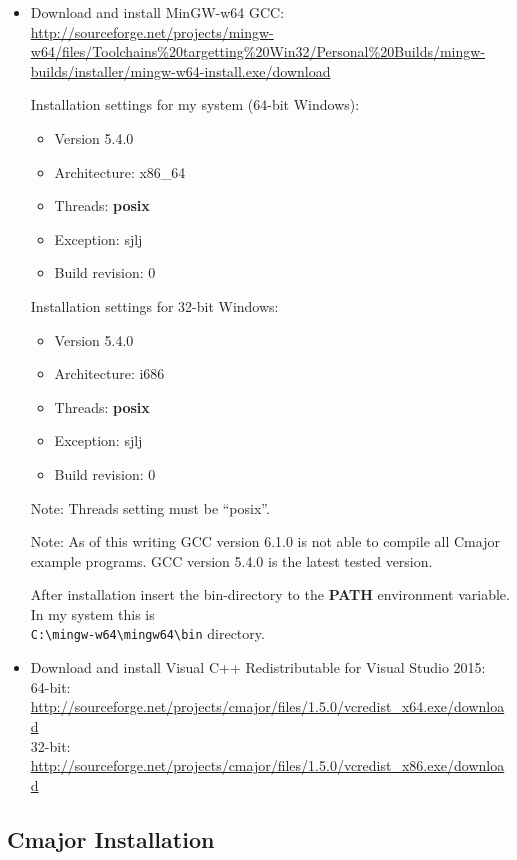 \documentclass[oneside, a4paper, 11pt]{article}
\begin{document}
\begin{itemize}

\item
Download and install MinGW-w64 GCC:\\
\url{http://sourceforge.net/projects/mingw-w64/files/Toolchains%20targetting%20Win32/Personal%20Builds/mingw-builds/installer/mingw-w64-install.exe/download}

Installation settings for my system (64-bit Windows):
\begin{itemize}
\item
Version 5.4.0
\item
Architecture: x86\_64
\item
Threads: \textbf{posix}
\item
Exception: sjlj
\item
Build revision: 0
\end{itemize}

Installation settings for 32-bit Windows:
\begin{itemize}
\item
Version 5.4.0
\item
Architecture: i686
\item
Threads: \textbf{posix}
\item
Exception: sjlj
\item
Build revision: 0
\end{itemize}

Note: Threads setting must be ``posix''.

Note: As of this writing GCC version 6.1.0 is not able to compile all Cmajor example programs.
      GCC version 5.4.0 is the latest tested version.

After installation insert the bin-directory to the \textbf{PATH} environment variable.
In my system this is\\
\verb|C:\mingw-w64\mingw64\bin| directory.

\item
Download and install Visual C++ Redistributable for Visual Studio 2015:\\
64-bit: \url{http://sourceforge.net/projects/cmajor/files/1.5.0/vcredist_x64.exe/download}\\
32-bit: \url{http://sourceforge.net/projects/cmajor/files/1.5.0/vcredist_x86.exe/download}
\end{itemize}

\subsection{Cmajor Installation}
\end{document}

